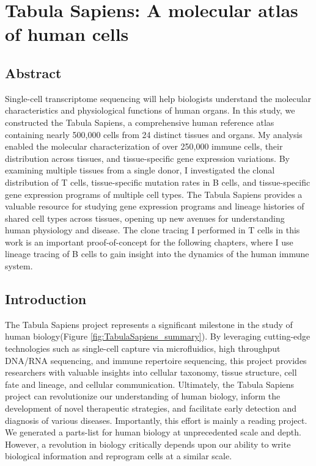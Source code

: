 \chapter{Tabula Sapiens: A molecular atlas of human cells}

\section{Abstract}
Single-cell transcriptome sequencing will help biologists understand the molecular characteristics and physiological functions of human organs. In this study, we constructed the Tabula Sapiens, a comprehensive human reference atlas containing nearly 500,000 cells from 24 distinct tissues and organs. My analysis enabled the molecular characterization of over 250,000 immune cells, their distribution across tissues, and tissue-specific gene expression variations. By examining multiple tissues from a single donor, I investigated the clonal distribution of T cells, tissue-specific mutation rates in B cells, and tissue-specific gene expression programs of multiple cell types. The Tabula Sapiens provides a valuable resource for studying gene expression programs and lineage histories of shared cell types across tissues, opening up new avenues for understanding human physiology and disease. The clone tracing I performed in T cells in this work is an important proof-of-concept for the following chapters, where I use lineage tracing of B cells to gain insight into the dynamics of the human immune system. 

\section{Introduction}

The Tabula Sapiens project represents a significant milestone in the study of human biology(Figure \ref{fig:TabulaSapiens_summary}). By leveraging cutting-edge technologies such as single-cell capture via microfluidics, high throughput DNA/RNA sequencing, and immune repertoire sequencing, this project provides researchers with valuable insights into cellular taxonomy, tissue structure, cell fate and lineage, and cellular communication. Ultimately, the Tabula Sapiens project can revolutionize our understanding of human biology, inform the development of novel therapeutic strategies, and facilitate early detection and diagnosis of various diseases. Importantly, this effort is mainly a reading project. We generated a parts-list for human biology at unprecedented scale and depth. However, a revolution in biology critically depends upon our ability to write biological information and reprogram cells at a similar scale.  


